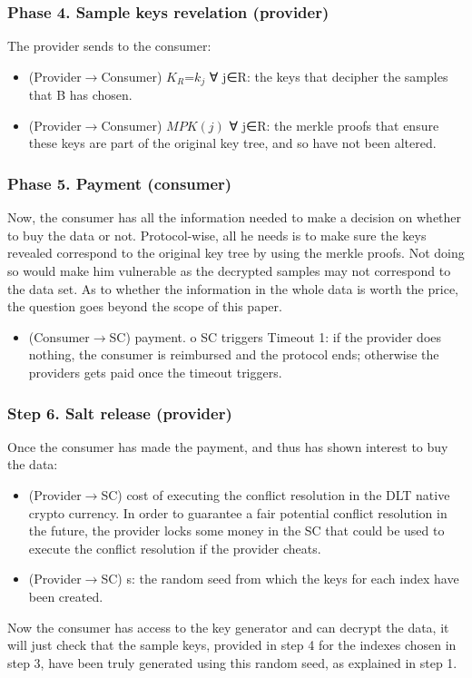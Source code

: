 \documentclass[]{article}
\begin{document}
	\subsubsection{Phase 4. Sample keys revelation (provider)}
	The provider sends to the consumer: 
	\begin{itemize}
		\item (Provider$\rightarrow$Consumer) $K_R$={$k_j$}  ∀  j∈R: the keys that decipher the samples that B has chosen.
		\item (Provider$\rightarrow$Consumer) {$MPK(j)$}  ∀  j∈R: the merkle proofs  that ensure these keys are part of the original key tree, and so have not been altered.
	\end{itemize}
	
	\subsubsection{Phase 5. Payment (consumer)}
	Now, the consumer has all the information needed to make a decision on whether to buy the data or not. Protocol-wise, all he needs is to make sure the keys revealed correspond to the original key tree by using the merkle proofs. Not doing so would make him vulnerable as the decrypted samples may not correspond to the data set. As to whether the information in the whole data is worth the price, the question goes beyond the scope of this paper.
	\begin{itemize}
		\item (Consumer$\rightarrow$SC) payment. o	SC triggers Timeout 1: if the provider does nothing, the consumer is reimbursed and the protocol ends; otherwise the providers gets paid once the timeout triggers.
	\end{itemize}
	
	\subsubsection{Step 6. Salt release (provider)}
	Once the consumer has made the payment, and thus has shown interest to buy the data:
	\begin{itemize}
	\item (Provider$\rightarrow$SC) cost of executing the conflict resolution in the DLT native crypto currency. In order to guarantee a fair potential conflict resolution in the future, the provider locks some money in the SC that could be used to execute the conflict resolution if the provider cheats.
	\item (Provider$\rightarrow$SC) s: the random seed from which the keys for each index have been created.
	\end{itemize}
	Now the consumer has access to the key generator and can decrypt the data, it will just check that the sample keys, provided in step 4 for the indexes chosen in step 3, have been truly generated using this random seed, as explained in step 1.
\end{document}
